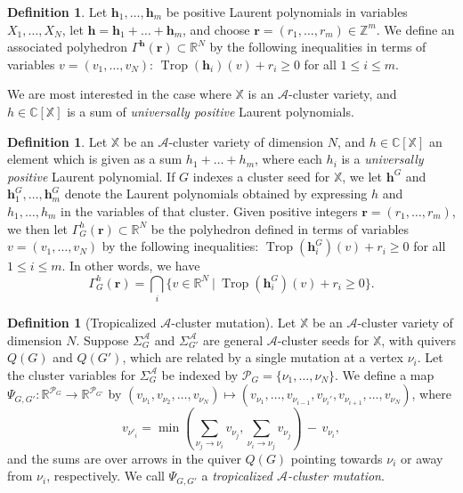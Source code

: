 \documentclass{amsart}
\theoremstyle{definition}
\newtheorem{defn}[thm]{Definition}
\newtheorem{definition}[thm]{Definition}
\numberwithin{equation}{section}
\newcommand{\hh}{\mathbf h}
\newcommand{\rr}{\mathbf r}
\newcommand{\R}{\mathbb R}
\newcommand{\Q}{\Gamma}
\newcommand{\C}{\mathbb{C}}
\newcommand{\Z}{\mathbb{Z}}
\renewcommand{\min}{{\operatorname{min}}}
\newcommand{\Trop}{\operatorname{Trop}}
\begin{document}
\begin{definition}\label{def:troppoly}
Let $\hh_1,\dots,\hh_m$ be positive Laurent polynomials in variables $X_1,\dots,X_N$, 
let $\hh=\hh_1 + \dots + \hh_m$, and choose $\rr=(r_1,\dots,r_m)\in \Z^m$.
We define an associated polyhedron 
	$\Q^\hh(\rr) \subset \R^N$ by 
	the following  inequalities in terms of variables $v = (v_1,\dots,v_N)$:
	$\Trop(\hh_i)(v) + r_i \geq 0$ for all $1 \leq i \leq m$.
\end{definition}

We are most interested in the case where 
	 $\mathbb{X}$ is an $\mathcal A$-cluster variety, and $h\in\C[\mathbb{X}]$ is a sum
	 of {\it universally positive} Laurent polynomials.

\begin{definition}\label{def:troppoly2}
 Let $\mathbb{X}$ be an $\mathcal A$-cluster variety of dimension $N$, 
 and $h\in \C[\mathbb{X}]$ an element which is given as a sum  $h_1+ \dots + h_m$,
 where each $h_i$ is a 
	 {\it universally positive} Laurent polynomial.  If $G$ indexes a cluster seed for $\mathbb{X}$,
	 we let $\hh^G$ and $\hh_1^G,\dots, \hh_m^G$ denote the Laurent polynomials
	 obtained by expressing $h$ and $h_1,\dots, h_m$ in the variables of that cluster.
	 Given positive integers $\rr = (r_1,\dots, r_m)$, 
	we then let $\Q^h_G(\rr) \subset \R^N$ be the polyhedron defined  in terms of variables $v = (v_1,\dots,v_N)$ by 
	the following  inequalities:
	$\Trop(\hh_i^G)(v) + r_i \geq 0$ for all $1 \leq i \leq m$.
        In other words, we have 
	\begin{equation}
		\Q^h_G(\rr) = \bigcap_i \{v\in \R^{N} \ \vert \ \Trop(\hh_i^G)(v) + r_i \geq 0\}.
        \end{equation}
\end{definition}



\begin{defn}[Tropicalized $\mathcal A$-cluster mutation]\label{d:PsiGG'}
Let $\mathbb{X}$ be an $\mathcal A$-cluster variety of dimension $N$.  
Suppose $\Sigma^{\mathcal A}_G$ and $\Sigma^{\mathcal A}_{G'}$ are general $\mathcal{A}$-cluster 
seeds for $\mathbb{X}$, with quivers $Q(G)$ and $Q(G')$,
which are related by a single mutation at a vertex $\nu_i$. 
Let the cluster variables for $\Sigma^{\mathcal A}_G$ be  indexed by
$\mathcal P_G=\{\nu_1,\dots, \nu_N\}$. 
  We define a map 
 $\Psi_{G,G'}:\R^{\mathcal P_G}\to \R^{\mathcal P_{G'}}$ by
	$(v_{\nu_1},v_{\nu_2}, \dots,v_{\nu_N}) \mapsto
(v_{\nu_1}, \dots,v_{\nu_{i-1}}, v_{\nu_i'},v_{\nu_{i+1}},\dotsc, v_{\nu_N})$, where
\begin{equation}\label{e:tropmut}
v_{\nu'_i} = \min(\sum_{\nu_j \to \nu_i} v_{\nu_j}, \sum_{\nu_i \to \nu_j} v_{\nu_j})\, - \, v_{\nu_i}, 
\end{equation}
and the sums are over arrows in the quiver $Q(G)$ pointing towards $\nu_i$ or away from $\nu_i$, respectively. We call $\Psi_{G,G'}$ a \emph {tropicalized $\mathcal A$-cluster mutation}.
\end{defn}
\end{document}
